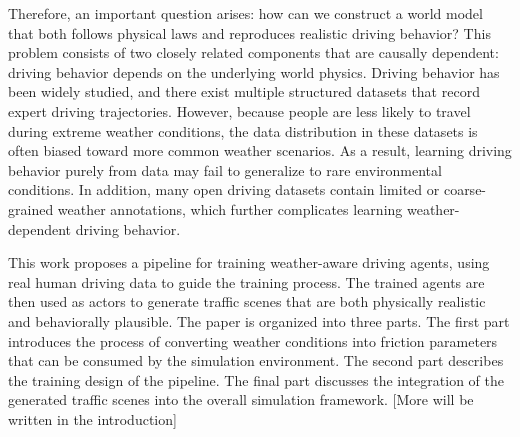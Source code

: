 Therefore, an important question arises: how can we construct a world model that both follows physical laws and reproduces realistic driving behavior? This problem consists of two closely related components that are causally dependent: driving behavior depends on the underlying world physics. Driving behavior has been widely studied, and there exist multiple structured datasets that record expert driving trajectories. However, because people are less likely to travel during extreme weather conditions, the data distribution in these datasets is often biased toward more common weather scenarios. As a result, learning driving behavior purely from data may fail to generalize to rare environmental conditions. In addition, many open driving datasets contain limited or coarse-grained weather annotations, which further complicates learning weather-dependent driving behavior.

This work proposes a pipeline for training weather-aware driving agents, using real human driving data to guide the training process. The trained agents are then used as actors to generate traffic scenes that are both physically realistic and behaviorally plausible. The paper is organized into three parts. The first part introduces the process of converting weather conditions into friction parameters that can be consumed by the simulation environment. The second part describes the training design of the pipeline. The final part discusses the integration of the generated traffic scenes into the overall simulation framework.
[More will be written in the introduction]

